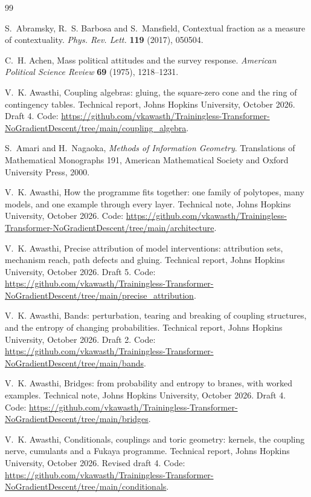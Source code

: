 \documentclass[11pt]{article}
\theoremstyle{definition}
\theoremstyle{remark}
\begin{document}
\begin{thebibliography}{99}

S.~Abramsky, R.~S. Barbosa and S.~Mansfield, Contextual fraction as a measure of contextuality. \emph{Phys. Rev. Lett.} \textbf{119} (2017), 050504.

C.~H. Achen, Mass political attitudes and the survey response. \emph{American Political Science Review} \textbf{69} (1975), 1218--1231.

V.~K. Awasthi, Coupling algebras: gluing, the square-zero cone and the ring of contingency tables. Technical report, Johns
Hopkins University, October 2026. Draft 4. Code: \url{https://github.com/vkawasth/Trainingless-Transformer-NoGradientDescent/tree/main/coupling_algebra}.

S.~Amari and H.~Nagaoka, \emph{Methods of Information Geometry}. Translations of Mathematical Monographs 191, American Mathematical
Society and Oxford University Press, 2000.

V.~K. Awasthi, How the programme fits together: one family of polytopes, many models, and one example through every layer. Technical
note, Johns Hopkins University, October 2026. Code: \url{https://github.com/vkawasth/Trainingless-Transformer-NoGradientDescent/tree/main/architecture}.

V.~K. Awasthi, Precise attribution of model interventions: attribution sets, mechanism reach, path defects and gluing.
Technical report, Johns Hopkins University, October 2026. Draft 5. Code: \url{https://github.com/vkawasth/Trainingless-Transformer-NoGradientDescent/tree/main/precise_attribution}.

V.~K. Awasthi, Bands: perturbation, tearing and breaking of coupling structures, and the entropy of changing probabilities.
Technical report, Johns Hopkins University, October 2026. Draft 2. Code: \url{https://github.com/vkawasth/Trainingless-Transformer-NoGradientDescent/tree/main/bands}.

V.~K. Awasthi, Bridges: from probability and entropy to branes, with worked examples. Technical note, Johns Hopkins University,
October 2026. Draft 4. Code: \url{https://github.com/vkawasth/Trainingless-Transformer-NoGradientDescent/tree/main/bridges}.

V.~K. Awasthi, Conditionals, couplings and toric geometry: kernels, the coupling nerve, cumulants and a {F}ukaya
programme. Technical report, Johns Hopkins University, October 2026. Revised draft 4. Code: \url{https://github.com/vkawasth/Trainingless-Transformer-NoGradientDescent/tree/main/conditionals}.


\end{thebibliography}
\end{document}
